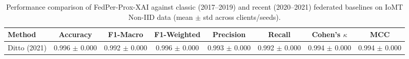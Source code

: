 \begin{table}[t]
\centering
\caption{Performance comparison of FedPer-Prox-XAI against classic (2017--2019) and recent (2020--2021) federated baselines on IoMT Non-IID data (mean $\pm$ std across clients/seeds).}
\label{tab:sota_comparison}
\begin{tabular}{lccccccc}
\toprule
Method & Accuracy & F1-Macro & F1-Weighted & Precision & Recall & Cohen's $\kappa$ & MCC \\
\midrule
Ditto (2021) & 0.996 $\pm$ 0.000 & 0.992 $\pm$ 0.000 & 0.996 $\pm$ 0.000 & 0.993 $\pm$ 0.000 & 0.992 $\pm$ 0.000 & 0.994 $\pm$ 0.000 & 0.994 $\pm$ 0.000 \\
\bottomrule
\end{tabular}
\end{table}
